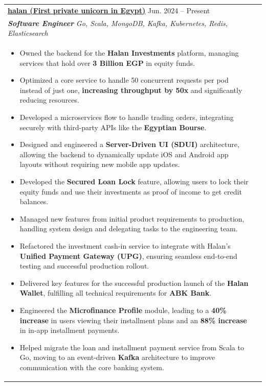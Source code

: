 \documentclass[a4paper,10pt]{article}
\begin{document}
    \begin{tabularx}{\linewidth}{ @{}l r@{} }
\textbf{\uline{\href{https://halan.com/}{halan (First private unicorn in Egypt)}}} \hfill \color[HTML]{371e77} Jun. 2024 – Present \\[4pt]
\color[HTML]{371e77}\textbf{\textit{Software Engineer}} \hfill \color[HTML]{4B28A4} \textit{Go, Scala, MongoDB, Kafka, Kubernetes, Redis, Elasticsearch} \\[5pt]
\begin{minipage}[t]{\linewidth}
    \begin{itemize}[nosep,after=\strut, leftmargin=2em, itemsep=2pt]
        \item Owned the backend for the \textbf{Halan Investments} platform, managing services that hold over \textbf{3 Billion EGP} in equity funds.
        \item Optimized a core service to handle 50 concurrent requests per pod instead of just one, \textbf{increasing throughput by 50x} and significantly reducing resources.
        \item Developed a microservices flow to handle trading orders, integrating securely with third-party APIs like the \textbf{Egyptian Bourse}.
        \item Designed and engineered a \textbf{Server-Driven UI (SDUI)} architecture, allowing the backend to dynamically update iOS and Android app layouts without requiring new mobile app updates.
        \item Developed the \textbf{Secured Loan Lock} feature, allowing users to lock their equity funds and use their investments as proof of income to get credit balances.
        \item Managed new features from initial product requirements to production, handling system design and delegating tasks to the engineering team.
        \item Refactored the investment cash-in service to integrate with Halan's \textbf{Unified Payment Gateway (UPG)}, ensuring seamless end-to-end testing and successful production rollout.
        \item Delivered key features for the successful production launch of the \textbf{Halan Wallet}, fulfilling all technical requirements for \textbf{ABK Bank}.
        \item Engineered the \textbf{Microfinance Profile} module, leading to a \textbf{40\% increase} in users viewing their installment plans and an \textbf{88\% increase} in in-app installment payments.
        \item Helped migrate the loan and installment payment service from Scala to Go, moving to an event-driven \textbf{Kafka} architecture to improve communication with the core banking system.

\end{itemize}
\end{minipage}
\end{tabularx}
\end{document}
